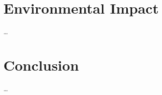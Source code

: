 \documentclass{article}
\begin{document}
{
    \section{Environmental Impact}
    \label{sec:env-impact}

    …
}

{
    \section{Conclusion}
    \label{sec:conclusion}

    …
}

{
    
}
\end{document}
